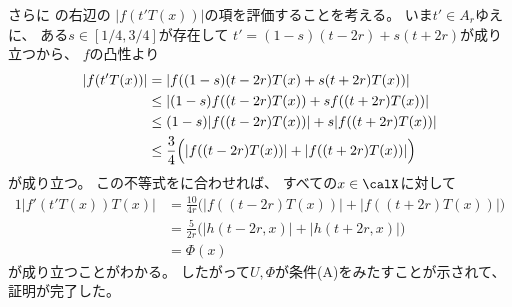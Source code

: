 \documentclass[report]{jlreq}
\begin{document}
\begin{answer}
    さらに
    の右辺の
    $|f(t'T(x))|$の項を評価することを考える。
    いま$t' \in A_r$ゆえに、
    ある$s \in [1/4, 3/4]$が存在して
    $t' = (1 - s)(t - 2r) + s(t + 2r)$が成り立つから、
    $f$の凸性より
    \begin{alignat}{1}
        |f(t'T(x))|
            &=
                \left|{
                    f((1 - s)(t - 2r)T(x) + s(t + 2r)T(x))
                }\right|
                \\
            &\le
                \left|{
                    (1 - s)f((t - 2r)T(x)) + sf((t + 2r)T(x))
                }\right|
                \\
            &\le
                (1 - s) |f((t - 2r)T(x))| + s |f((t + 2r)T(x))|
                \\
            &\le
                \frac{3}{4}
                \Big(
                    |f((t - 2r)T(x))| + |f((t + 2r)T(x))|
                \Big)
    \end{alignat}
    が成り立つ。
    この不等式をに合わせれば、
    すべての$x \in \calX$に対して
    \begin{alignat}{1}
        |f'(t'T(x)) T(x)|
            &=
                \frac{10}{4r}
                \Big(
                    |f((t - 2r)T(x))|
                    +
                    |f((t + 2r)T(x))|
                \Big)
                \\
            &=
                \frac{5}{2r}
                \Big(
                    |h(t - 2r, x)|
                    +
                    |h(t + 2r, x)|
                \Big)
                \\
            &=
                \Phi(x)
    \end{alignat}
    が成り立つことがわかる。
    したがって$U, \Phi$が条件(A)をみたすことが示されて、
    証明が完了した。
\end{answer}
\end{document}
